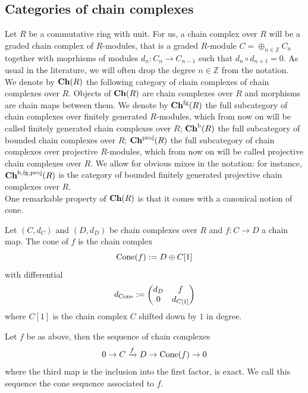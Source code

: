 \subsection{Categories of chain complexes}\label{se:chR}
Let $R$ be a commutative ring with unit. For us, a chain complex over $R$ will be a graded chain complex of $R$-modules, that is a graded $R$-module $C=\oplus_{n\in \mathbb{Z}}C_n$ together with moprhisms of modules $d_n\colon C_n\to C_{n-1}$ such that $d_n\circ d_{n+1}=0$. As usual in the literature, we will often drop the degree $n\in \mathbb{Z}$ from the notation.\\

We denote by $\mathbf{Ch}(R)$ the following category of chain complexes of chain complexes over $R$. Objects of $\mathbf{Ch}(R)$ are chain complexes over $R$ and morphisms are chain maps between them. We denote by $\mathbf{Ch}^{\text{fg}}(R)$ the full subcategory of chain complexes over finitely generated $R$-modules, which from now on will be called finitely generated chain complexes over $R$; $\mathbf{Ch}^{\text{b}}(R)$ the full subcategory of bounded chain complexes over $R$; $\mathbf{Ch}^{\text{proj}}(R)$ the full subcategory of chain complexes over projective $R$-modules, which from now on will be called projective chain complexes over $R$. We allow for obvious mixes in the notation: for instance, $\mathbf{Ch}^{\text{b},\text{fg},\text{proj}}(R)$ is the category of bounded finitely generated projective chain complexes over $R$. \\

One remarkable property of $\mathbf{Ch}(R)$ is that it comes with a canonical notion of cone.
\begin{dfn}
    Let $(C,d_C)$ and $(D,d_D)$ be chain complexes over $R$ and $f\colon  C\to D$ a chain map. The cone of $f$ is the chain complex $$\text{Cone}(f):= D\oplus C[1]$$ with differential $$d_{\text{Cone}}:= \begin{pmatrix}
        d_D & f\\
        0 & d_{C[1]}
    \end{pmatrix}$$ where $C[1]$ is the chain complex $C$ shifted down by $1$ in degree.
\end{dfn}
Let $f$ be as above, then the sequence of chain complexes $$0\to C\xrightarrow{f}D\to \text{Cone}(f)\to 0$$ where the third map is the inclusion into the first factor, is exact. We call this sequence the cone sequence associated to $f$.\\ 

